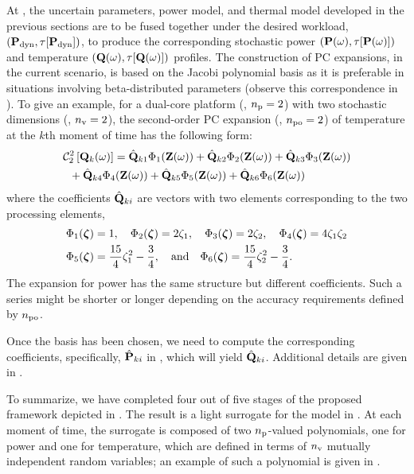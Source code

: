 At , the uncertain parameters, power model, and thermal model developed in the previous sections are to be fused together under the desired workload, $\profilePdyn$, to produce the corresponding stochastic power $\profileP{\o}$ and temperature $\profileT{\o}$ profiles.
The construction of PC expansions, in the current scenario, is based on the Jacobi polynomial basis as it is preferable in situations involving beta-distributed parameters \cite{xiu2010} (observe this correspondence in ).
To give an example, for a dual-core platform (\ie, ${n_\text{p}} = 2$) with two stochastic dimensions (\ie, ${n_\text{v}} = 2$), the second-order PC expansion (\ie, ${n_\text{po}} = 2$) of temperature at the $k$th moment of time has the following form:
\begin{align}
  & \oPC{2}{2}{\vTO_k(\o)} = \pcc{\vTO}_{k1} \pcb_1(\vZ(\o)) + \pcc{\vTO}_{k2} \pcb_2(\vZ(\o)) + \pcc{\vTO}_{k3} \pcb_3(\vZ(\o)) \nonumber \\
  & {} \; \; + \pcc{\vTO}_{k4} \pcb_4(\vZ(\o)) + \pcc{\vTO}_{k5} \pcb_5(\vZ(\o)) + \pcc{\vTO}_{k6} \pcb_6(\vZ(\o)) \elabel{pc-example}
\end{align}
where the coefficients $\hat{\mathbf{Q}}_{ki}$ are vectors with two elements corresponding to the two processing elements,
\begin{align*}
  & \Phi_1(\boldsymbol{\zeta}) = 1, \hspace{1em} \Phi_2(\boldsymbol{\zeta}) = 2 \zeta_1, \hspace{1em} \Phi_3(\boldsymbol{\zeta}) = 2 \zeta_2, \hspace{1em} \Phi_4(\boldsymbol{\zeta}) = 4 \zeta_1 \zeta_2 \\
  & \Phi_5(\boldsymbol{\zeta}) = \frac{15}{4} \zeta_1^2 - \frac{3}{4}, \hspace{1em} \text{and} \hspace{1em} \Phi_6(\boldsymbol{\zeta}) = \frac{15}{4} \zeta_2^2 - \frac{3}{4}.
\end{align*}
The expansion for power has the same structure but different coefficients.
Such a series might be shorter or longer depending on the accuracy requirements defined by ${n_\text{po}}$.

Once the basis has been chosen, we need to compute the corresponding coefficients, specifically, $\hat{\mathbf{P}}_{ki}$ in , which will yield $\hat{\mathbf{Q}}_{ki}$.
Additional details are given in .

To summarize, we have completed four out of five stages of the proposed framework depicted in .
The result is a light surrogate for the model in .
At each moment of time, the surrogate is composed of two ${n_\text{p}}$-valued polynomials, one for power and one for temperature, which are defined in terms of ${n_\text{v}}$ mutually independent random variables; an example of such a polynomial is given in .
